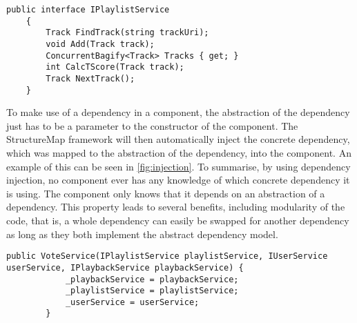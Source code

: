 \begin{lstlisting}[caption = {Abstraction of a dependency abstraction
    using C\# interfaces. A concrete dependency has to implement the
    methods described in the abstraction.}, label={fig:dep_abstraction}]
public interface IPlaylistService
    {
        Track FindTrack(string trackUri);
        void Add(Track track);
        ConcurrentBagify<Track> Tracks { get; }
        int CalcTScore(Track track);
        Track NextTrack();
    }
\end{lstlisting}

To make use of a dependency in a component, the abstraction of the
dependency just has to be a parameter to the constructor of the
component. The StructureMap framework will then automatically inject
the concrete dependency, which was mapped to the abstraction of the
dependency, into the component. An example of this can be seen in
\cref{fig:injection}. To summarise, by using dependency injection, no component ever
has any knowledge of which concrete dependency it is using. The
component only knows that it depends on an abstraction of a
dependency. This property leads to several benefits, including
modularity of the code, that is, a whole dependency can easily be swapped for
another dependency as long as they both implement the abstract
dependency model.

\begin{lstlisting}[caption = {Dependency Injection through class
    constructors. IPlaylistService, IUserService and IPlaybackService
    are all abstractions of dependencies.}, label={fig:injection}]
public VoteService(IPlaylistService playlistService, IUserService userService, IPlaybackService playbackService) {
            _playbackService = playbackService;
            _playlistService = playlistService;
            _userService = userService;
        }
\end{lstlisting}

